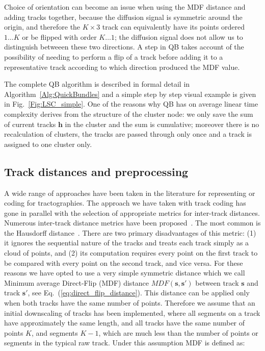 \documentclass{bioinfo}
\begin{document}
\begin{methods}
Choice of orientation can become an issue when using the MDF distance
and adding tracks together, because the diffusion signal is symmetric
around the origin, and therefore the $K \times 3$ track can equivalently
have its points ordered $1 \dots K$ or be flipped with order $K \dots
1$; the diffusion signal does not allow us to distinguish betweeen these
two directions. A step in QB takes account of the possibility of needing
to perform a flip of a track before adding it to a representative track
according to which direction produced the MDF value.

The complete QB algorithm is described in formal detail in
Algorithm~\ref{Alg:QuickBundles} and a simple step by step visual example is
given in Fig.~\ref{Fig:LSC_simple}.  One of the reasons why QB has on
average linear time complexity derives from the structure of the cluster
node: we only save the sum of current tracks $\mathbf{h}$ in the cluster and the
sum is cumulative; moreover there is no recalculation of clusters, the
tracks are passed through only once and a track is assigned to one
cluster only. 

\subsection{\label{sub:track-distances}Track distances and preprocessing}

A wide range of approaches have been taken in the literature for
representing or coding for tractographies. The approach we have taken with track
coding has gone in parallel with the selection of appropriate metrics for
inter-track distances.  Numerous inter-track distance metrics have been
proposed~\citep{Ding2003, MaddahIPMI2007, zhang2005dti}. The most common is the
Hausdorff distance~\citep[and many other
studies]{corouge2004towards}. There are two primary disadvantages of
this metric: (1) it ignores the sequential nature of the tracks and
treats each track simply as a cloud of points, and (2) its computation
requires every point on the first track to be compared with every point
on the second track, and vice versa. For these reasons we have opted to
use a very simple symmetric distance \citep{EGMB10, Visser2010} which we
call Minimum average Direct-Flip (MDF) distance $MDF(\mathbf{s},\mathbf{s'})$ between
track $\mathbf{s}$ and track $\mathbf{s'}$, see Eq.~(\ref{eq:direct_flip_distance}). This
distance can be applied only when both tracks have the same number of
points. Therefore we assume that an initial downscaling of tracks has
been implemented, where all segments on a track have approximately the
same length, and all tracks have the same number of points $K$, and segments
$K-1$, which are much less than the number of points or segments in the typical
raw track.  Under this assumption MDF is defined as:


\end{methods}
\end{document}
